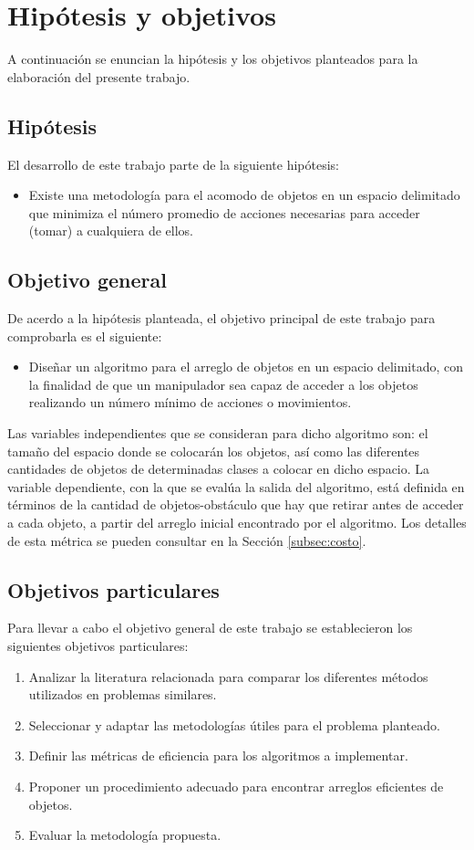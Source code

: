 \section{Hipótesis y objetivos}
%
%
A continuación se enuncian la hipótesis y los objetivos planteados para la elaboración del presente trabajo.
%
%
\subsection{Hipótesis}
%
%
El desarrollo de este trabajo parte de la siguiente hipótesis:
%
\begin{itemize}[label = $\blacktriangleright$]
	\item Existe una metodología para el acomodo de objetos en un espacio delimitado que minimiza el número promedio de acciones necesarias para acceder (tomar) a cualquiera de ellos.
\end{itemize}
%
%
\subsection{Objetivo general}
%
%
De acerdo a la hipótesis planteada, el objetivo principal de este trabajo para comprobarla es el siguiente:
%
{
\begin{itemize}[label = $\blacktriangleright$]
	\item Diseñar un algoritmo para el arreglo de objetos en un espacio delimitado, con la finalidad de que un manipulador sea capaz de acceder a los objetos realizando un número mínimo de acciones o movimientos.
\end{itemize}}
%
\noindent Las variables independientes que se consideran para dicho algoritmo son: el tamaño del espacio donde se colocarán los objetos, así como las diferentes cantidades de objetos de determinadas clases a colocar en dicho espacio.
La variable dependiente, con la que se evalúa la salida del algoritmo, está definida en términos de la cantidad de objetos-obstáculo que hay que retirar antes de acceder a cada objeto, a partir del arreglo inicial encontrado por el algoritmo.
Los detalles de esta métrica se pueden consultar en la Sección \ref{subsec:costo}.
%
%
\subsection{Objetivos particulares}
%
%
Para llevar a cabo el objetivo general de este trabajo se establecieron los siguientes objetivos particulares:
%
\begin{enumerate}
	\item Analizar la literatura relacionada para comparar los diferentes métodos utilizados en problemas similares.
	\item Seleccionar y adaptar las metodologías útiles para el problema planteado.
	\item Definir las métricas de eficiencia para los algoritmos a implementar.
	\item Proponer un procedimiento adecuado para encontrar arreglos eficientes de objetos.
	\item Evaluar la metodología propuesta.
\end{enumerate}
%
%
